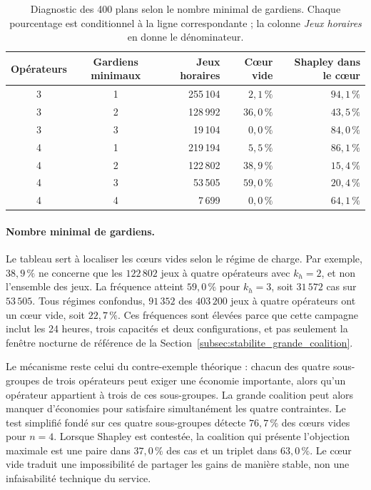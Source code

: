 \begin{table}[htbp]
\centering
\begin{tabular}{ccrrr}
\hline
Opérateurs & Gardiens minimaux & Jeux horaires & Cœur vide &
Shapley dans le cœur \\
\hline
3 & 1 & 255\,104 & \(2{,}1\,\%\) & \(94{,}1\,\%\) \\
3 & 2 & 128\,992 & \(36{,}0\,\%\) & \(43{,}5\,\%\) \\
3 & 3 & 19\,104 & \(0{,}0\,\%\) & \(84{,}0\,\%\) \\
\hline
4 & 1 & 219\,194 & \(5{,}5\,\%\) & \(86{,}1\,\%\) \\
4 & 2 & 122\,802 & \(38{,}9\,\%\) & \(15{,}4\,\%\) \\
4 & 3 & 53\,505 & \(59{,}0\,\%\) & \(20{,}4\,\%\) \\
4 & 4 & 7\,699 & \(0{,}0\,\%\) & \(64{,}1\,\%\) \\
\hline
\end{tabular}
\caption{Diagnostic des 400 plans selon le nombre minimal de gardiens. Chaque
pourcentage est conditionnel à la ligne correspondante ; la colonne
\emph{Jeux horaires} en donne le dénominateur.}
\label{tab:seuils_capacite}
\end{table}

\paragraph{Nombre minimal de gardiens.}
Le tableau sert à localiser les cœurs vides selon le régime de charge. Par
exemple, \(38{,}9\,\%\) ne concerne que les \(122\,802\) jeux à quatre
opérateurs avec \(k_h=2\), et non l'ensemble des jeux. La fréquence atteint
\(59{,}0\,\%\) pour \(k_h=3\), soit \(31\,572\) cas sur \(53\,505\). Tous
régimes confondus, \(91\,352\) des \(403\,200\) jeux à quatre opérateurs ont
un cœur vide, soit \(22{,}7\,\%\). Ces fréquences sont élevées parce que cette
campagne inclut les 24 heures, trois capacités et deux configurations, et pas
seulement la fenêtre nocturne de référence de la
Section~\ref{subsec:stabilite_grande_coalition}.

Le mécanisme reste celui du contre-exemple théorique : chacun des quatre
sous-groupes de trois opérateurs peut exiger une économie importante, alors
qu'un opérateur appartient à trois de ces sous-groupes. La grande coalition
peut alors manquer d'économies pour satisfaire simultanément les quatre
contraintes. Le test simplifié fondé sur ces quatre sous-groupes
détecte \(76{,}7\,\%\) des cœurs vides pour \(n=4\). Lorsque Shapley est
contestée, la coalition qui présente l'objection maximale est une paire dans
\(37{,}0\,\%\) des cas et un triplet dans \(63{,}0\,\%\). Le cœur vide traduit
une impossibilité de partager les gains de manière stable, non une
infaisabilité technique du service.

